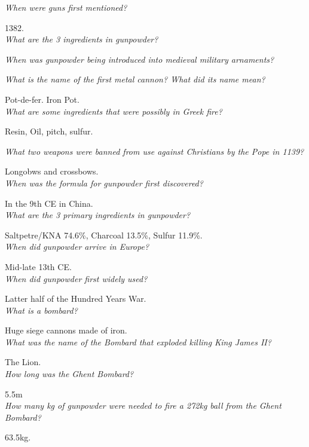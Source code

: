 \documentclass[12pt]{article}
\begin{document}
\textit{When were guns first mentioned?}

1382.\\

\textit{What are the 3 ingredients in gunpowder?}

\textit{When was gunpowder being introduced into medieval military arnaments?}

\textit{What is the name of the first metal cannon? What did its name mean?}

Pot-de-fer. Iron Pot.\\

\textit{What are some ingredients that were possibly in Greek fire?}

Resin, Oil, pitch, sulfur.

\textit{What two weapons were banned from use against Christians by the Pope in 1139?}

Longobws and crossbows.\\

\textit{When was the formula for gunpowder first discovered?}

In the 9th CE in China.\\

\textit{What are the 3 primary ingredients in gunpowder?}

Saltpetre/KNA 74.6\%, Charcoal 13.5\%, Sulfur 11.9\%.\\

\textit{When did gunpowder arrive in Europe?}

Mid-late 13th CE.\\

\textit{When did gunpowder first widely used?}

Latter half of the Hundred Years War.\\

\textit{What is a bombard?}

Huge siege cannons made of iron.\\

\textit{What was the name of the Bombard that exploded killing King James II?}

The Lion.\\

\textit{How long was the Ghent Bombard?}

5.5m\\

\textit{How many kg of gunpowder were needed to fire a 272kg ball from the Ghent Bombard?}

63.5kg.\\
\end{document}
